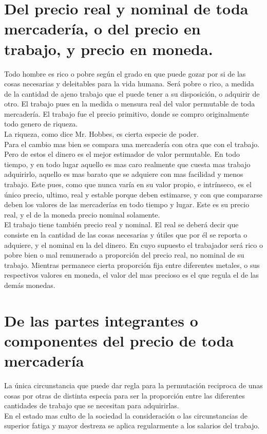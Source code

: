\documentclass[10pt]{article}
\begin{document}
\begin{multicols}{2}
\section*{Del precio real y nominal de toda mercadería, o del precio en trabajo, y precio en moneda.}
{\color{blue}Todo hombre es rico o pobre según el grado en que puede gozar por si de las cosas necesarias y deleitables para la vida humana. Será pobre o rico, a medida de la cantidad de ajeno trabajo que el puede tener a su disposición, o adquirir de otro.} El trabajo pues en la medida o mensura real del valor permutable de toda mercadería. El trabajo fue el precio primitivo, donde se compro originalmente todo genero de riqueza.\\
{\color{blue} La riqueza, como dice Mr. Hobbes, es cierta especie de poder.}\\
Para el cambio mas bien se compara una mercadería con otra que con el trabajo. Pero de estos el dinero es el mejor estimador de valor permutable. {\color{blue} En todo tiempo, y en todo lugar aquello es mas caro realmente que cuesta mas trabajo adquirirlo, aquello es mas barato que se adquiere con mas facilidad y menos trabajo.} Este pues, como que nunca varía en su valor propio, e intrínseco, es el único precio, ultimo, real y estable porque deben estimarse, y con que compararse deben los valores de las mercaderías en todo tiempo y lugar. Este es su precio real, y el de la moneda precio nominal solamente.\\
{\color{blue}El trabajo tiene también precio real y nominal. El real se deberá decir que consiste en la cantidad de las cosas necesarias y útiles que por él se reporta o adquiere, y el nominal en la del dinero. En cuyo supuesto el trabajador será rico o pobre bien o mal remunerado a proporción del precio real, no nominal de su trabajo.}
Mientras permanece cierta proporción fija entre diferentes metales, o sus respectivos valores en moneda, el valor del mas precioso es el que regula el de las demás monedas.
\section*{De las partes integrantes o componentes del precio de toda mercadería}
La única circunstancia que puede dar regla para la permutación reciproca de unas cosas por otras de distinta especia para ser la proporción entre las diferentes cantidades de trabajo que se necesitan para adquirirlas.\\
En el estado mas culto de la sociedad la consideración o las circunstancias de superior fatiga y mayor destreza se aplica regularmente a los salarios del trabajo.
\end{multicols}
\end{document}
